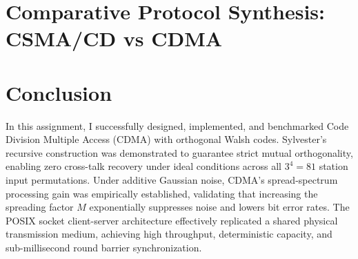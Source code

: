 \documentclass[11pt,a4paper]{article}
\begin{document}
\section{Comparative Protocol Synthesis: CSMA/CD vs CDMA}
\begin{table}[H]
\centering
\caption{MAC Layer Protocol Comparison: CSMA/CD vs CDMA with Walsh Codes}
\label{tab:comparison}
\end{table}

\section{Conclusion}
In this assignment, I successfully designed, implemented, and benchmarked Code Division Multiple Access (CDMA) with orthogonal Walsh codes. Sylvester's recursive construction was demonstrated to guarantee strict mutual orthogonality, enabling zero cross-talk recovery under ideal conditions across all $3^4 = 81$ station input permutations. Under additive Gaussian noise, CDMA's spread-spectrum processing gain was empirically established, validating that increasing the spreading factor $M$ exponentially suppresses noise and lowers bit error rates. The POSIX socket client-server architecture effectively replicated a shared physical transmission medium, achieving high throughput, deterministic capacity, and sub-millisecond round barrier synchronization.
\end{document}

